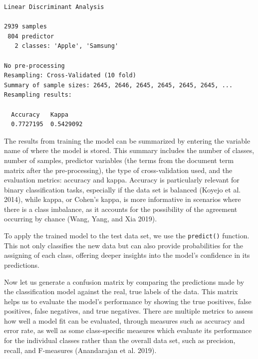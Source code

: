\begin{verbatim}
Linear Discriminant Analysis 

2939 samples
 804 predictor
   2 classes: 'Apple', 'Samsung' 

No pre-processing
Resampling: Cross-Validated (10 fold) 
Summary of sample sizes: 2645, 2646, 2645, 2645, 2645, 2645, ... 
Resampling results:

  Accuracy   Kappa    
  0.7727195  0.5429092
\end{verbatim}

The results from training the model can be summarized by entering the
variable name of where the model is stored. This summary includes the
number of classes, number of samples, predictor variables (the terms
from the document term matrix after the pre-processing), the type of
cross-validation used, and the evaluation metrics: accuracy and kappa.
Accuracy is particularly relevant for binary classification tasks,
especially if the data set is balanced (Koyejo et al. 2014), while kappa,
or Cohen's kappa, is more informative in scenarios where there is a class imbalance,
as it accounts for the possibility of the agreement occurring by chance
(Wang, Yang, and Xia 2019).

To apply the trained model to the test data set, we use the
\texttt{predict()} function. This not only classifies the new data but
can also provide probabilities for the assigning of each class, offering
deeper insights into the model's confidence in its predictions.

\begin{Shaded}
\begin{Highlighting}[]
\OtherTok{\textless{}{-}} 
\end{Highlighting}
\end{Shaded}

Now let us generate a confusion matrix by comparing the predictions made
by the classification model against the real, true labels of the data.
This matrix helps us to evaluate the model's performance by showing the
true positives, false positives, false negatives, and true negatives.
There are multiple metrics to assess how well a model fit can be
evaluated, through measures such as accuracy and error rate, as well as some
class-specific measures which evaluate its performance for the individual
classes rather than the overall data set, such as precision, recall, and
F-measures (Anandarajan et al. 2019).


